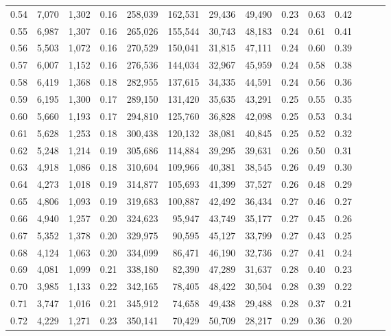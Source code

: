 \begin{tabular}{rrrrrrrrrrrrrr}
0.54 &  7,070 &  1,302 &  0.16 &  258,039 &  162,531 &  29,436 &  49,490 &  0.23 &  0.63 &      0.42 \\
0.55 &  6,987 &  1,307 &  0.16 &  265,026 &  155,544 &  30,743 &  48,183 &  0.24 &  0.61 &      0.41 \\
0.56 &  5,503 &  1,072 &  0.16 &  270,529 &  150,041 &  31,815 &  47,111 &  0.24 &  0.60 &      0.39 \\
0.57 &  6,007 &  1,152 &  0.16 &  276,536 &  144,034 &  32,967 &  45,959 &  0.24 &  0.58 &      0.38 \\
0.58 &  6,419 &  1,368 &  0.18 &  282,955 &  137,615 &  34,335 &  44,591 &  0.24 &  0.56 &      0.36 \\
0.59 &  6,195 &  1,300 &  0.17 &  289,150 &  131,420 &  35,635 &  43,291 &  0.25 &  0.55 &      0.35 \\
0.60 &  5,660 &  1,193 &  0.17 &  294,810 &  125,760 &  36,828 &  42,098 &  0.25 &  0.53 &      0.34 \\
0.61 &  5,628 &  1,253 &  0.18 &  300,438 &  120,132 &  38,081 &  40,845 &  0.25 &  0.52 &      0.32 \\
0.62 &  5,248 &  1,214 &  0.19 &  305,686 &  114,884 &  39,295 &  39,631 &  0.26 &  0.50 &      0.31 \\
0.63 &  4,918 &  1,086 &  0.18 &  310,604 &  109,966 &  40,381 &  38,545 &  0.26 &  0.49 &      0.30 \\
0.64 &  4,273 &  1,018 &  0.19 &  314,877 &  105,693 &  41,399 &  37,527 &  0.26 &  0.48 &      0.29 \\
0.65 &  4,806 &  1,093 &  0.19 &  319,683 &  100,887 &  42,492 &  36,434 &  0.27 &  0.46 &      0.27 \\
0.66 &  4,940 &  1,257 &  0.20 &  324,623 &   95,947 &  43,749 &  35,177 &  0.27 &  0.45 &      0.26 \\
0.67 &  5,352 &  1,378 &  0.20 &  329,975 &   90,595 &  45,127 &  33,799 &  0.27 &  0.43 &      0.25 \\
0.68 &  4,124 &  1,063 &  0.20 &  334,099 &   86,471 &  46,190 &  32,736 &  0.27 &  0.41 &      0.24 \\
0.69 &  4,081 &  1,099 &  0.21 &  338,180 &   82,390 &  47,289 &  31,637 &  0.28 &  0.40 &      0.23 \\
0.70 &  3,985 &  1,133 &  0.22 &  342,165 &   78,405 &  48,422 &  30,504 &  0.28 &  0.39 &      0.22 \\
0.71 &  3,747 &  1,016 &  0.21 &  345,912 &   74,658 &  49,438 &  29,488 &  0.28 &  0.37 &      0.21 \\
0.72 &  4,229 &  1,271 &  0.23 &  350,141 &   70,429 &  50,709 &  28,217 &  0.29 &  0.36 &      0.20 \\

\end{tabular}
